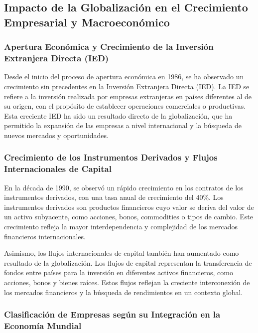 \documentclass[
  a4paper,
]{article}
\begin{document}
\subsection{Impacto de la Globalización en el Crecimiento Empresarial y
Macroeconómico}\label{impacto-de-la-globalizaciuxf3n-en-el-crecimiento-empresarial-y-macroeconuxf3mico}

\subsubsection{Apertura Económica y Crecimiento de la Inversión
Extranjera Directa
(IED)}\label{apertura-econuxf3mica-y-crecimiento-de-la-inversiuxf3n-extranjera-directa-ied}

Desde el inicio del proceso de apertura económica en 1986, se ha
observado un crecimiento sin precedentes en la Inversión Extranjera
Directa (IED). La IED se refiere a la inversión realizada por empresas
extranjeras en países diferentes al de su origen, con el propósito de
establecer operaciones comerciales o productivas. Esta creciente IED ha
sido un resultado directo de la globalización, que ha permitido la
expansión de las empresas a nivel internacional y la búsqueda de nuevos
mercados y oportunidades.

\subsubsection{Crecimiento de los Instrumentos Derivados y Flujos
Internacionales de
Capital}\label{crecimiento-de-los-instrumentos-derivados-y-flujos-internacionales-de-capital}

En la década de 1990, se observó un rápido crecimiento en los contratos
de los instrumentos derivados, con una tasa anual de crecimiento del
40\%. Los instrumentos derivados son productos financieros cuyo valor se
deriva del valor de un activo subyacente, como acciones, bonos,
commodities o tipos de cambio. Este crecimiento refleja la mayor
interdependencia y complejidad de los mercados financieros
internacionales.

Asimismo, los flujos internacionales de capital también han aumentado
como resultado de la globalización. Los flujos de capital representan la
transferencia de fondos entre países para la inversión en diferentes
activos financieros, como acciones, bonos y bienes raíces. Estos flujos
reflejan la creciente interconexión de los mercados financieros y la
búsqueda de rendimientos en un contexto global.

\subsubsection{Clasificación de Empresas según su Integración en la
Economía
Mundial}\label{clasificaciuxf3n-de-empresas-seguxfan-su-integraciuxf3n-en-la-economuxeda-mundial}
\end{document}
